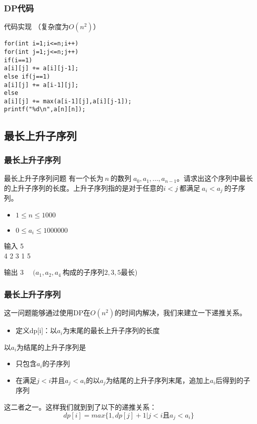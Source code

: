 \documentclass{beamer}
\begin{document}
\begin{frame}[fragile]
\frametitle{DP代码}
\begin{block}{代码实现  （复杂度为$O(n^2)$）}
\begin{lstlisting}
for(int i=1;i<=n;i++)
for(int j=1;j<=n;j++)
if(i==1)    
a[i][j] += a[i][j-1];
else if(j==1)
a[i][j] += a[i-1][j];
else
a[i][j] += max(a[i-1][j],a[i][j-1]);
printf("%d\n",a[n][n]);
\end{lstlisting}
\end{block}
\end{frame}
\fi


\subsection{最长上升子序列}
\begin{frame}
\frametitle{最长上升子序列}
\begin{block}{最长上升子序列问题}
	有一个长为$\ n\ $的数列$\;a_0, a_1, \dots, a_{n-1}$。请求出这个序列中最长的上升子序列的长度。上升子序列指的是对于任意的$i<j\ $都满足$\ a_i<a_j\ $的子序列。\\
	
	\begin{itemize}
		\item $1\le n \le 1000$
		\item $0\le a_i \le 1000000$
	\end{itemize}
\end{block}
\begin{block}{输入}
	5\\
	4 2 3 1 5
\end{block}
\begin{block}{输出}
	3 $\quad (a_1, a_2, a_4\ $构成的子序列$2, 3, 5$最长)
\end{block}
\end{frame}

\begin{frame}[fragile]
\frametitle{最长上升子序列}
这一问题能够通过使用DP在$O(n^2)$的时间内解决，我们来建立一下递推关系。
\begin{itemize}
	\item 定义dp[i]：以$a_i$为末尾的最长上升子序列的长度
\end{itemize}
以$a_i$为结尾的上升子序列是
\begin{itemize}
	\item 只包含$a_i$的子序列
	\item 在满足$j<i$并且$a_j<a_i$的以$a_j$为结尾的上升子序列末尾，追加上$a_i$后得到的子序列
\end{itemize}
这二者之一。这样我们就到到了以下的递推关系：\\
$$dp[i] = max\{1, dp[j]+1|j<i \text{且} a_j<a_i\}$$
\end{frame}
\end{document}
